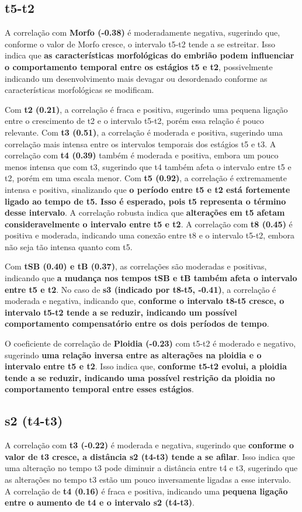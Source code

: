 \subsection*{t5-t2}
A correlação com \textbf{Morfo (-0.38)} é moderadamente negativa, sugerindo que, conforme o valor de Morfo cresce, o intervalo t5-t2 tende a se estreitar. Isso indica que \textbf{as características morfológicas do embrião podem influenciar o comportamento temporal entre os estágios t5 e t2}, possivelmente indicando um desenvolvimento mais devagar ou desordenado conforme as características morfológicas se modificam.

Com \textbf{t2 (0.21)}, a correlação é fraca e positiva, sugerindo uma pequena ligação entre o crescimento de t2 e o intervalo t5-t2, porém essa relação é pouco relevante. Com \textbf{t3 (0.51)}, a correlação é moderada e positiva, sugerindo uma correlação mais intensa entre os intervalos temporais dos estágios t5 e t3. A correlação com \textbf{t4 (0.39)} também é moderada e positiva, embora um pouco menos intensa que com t3, sugerindo que t4 também afeta o intervalo entre t5 e t2, porém em uma escala menor. Com \textbf{t5 (0.92)}, a correlação é extremamente intensa e positiva, sinalizando que \textbf{o período entre t5 e t2 está fortemente ligado ao tempo de t5. Isso é esperado, pois t5 representa o término desse intervalo}. A correlação robusta indica que \textbf{alterações em t5 afetam consideravelmente o intervalo entre t5 e t2}. A correlação com \textbf{t8 (0.45)} é positiva e moderada, indicando uma conexão entre t8 e o intervalo t5-t2, embora não seja tão intensa quanto com t5.

Com \textbf{tSB (0.40) e tB (0.37)}, as correlações são moderadas e positivas, indicando que \textbf{a mudança nos tempos tSB e tB também afeta o intervalo entre t5 e t2}. No caso de \textbf{s3 (indicado por t8-t5, -0.41)}, a correlação é moderada e negativa, indicando que, \textbf{conforme o intervalo t8-t5 cresce, o intervalo t5-t2 tende a se reduzir, indicando um possível comportamento compensatório entre os dois períodos de tempo}.

O coeficiente de correlação de \textbf{Ploidia (-0.23)} com t5-t2 é moderado e negativo, sugerindo \textbf{uma relação inversa entre as alterações na ploidia e o intervalo entre t5 e t2}. Isso indica que, \textbf{conforme t5-t2 evolui, a ploidia tende a se reduzir, indicando uma possível restrição da ploidia no comportamento temporal entre esses estágios}. 

\subsection*{s2 (t4-t3)}
A correlação com \textbf{t3 (-0.22)} é moderada e negativa, sugerindo que \textbf{conforme o valor de t3 cresce, a distância s2 (t4-t3) tende a se afilar}. Isso indica que uma alteração no tempo t3 pode diminuir a distância entre t4 e t3, sugerindo que as alterações no tempo t3 estão um pouco inversamente ligadas a esse intervalo. A correlação de \textbf{t4 (0.16)} é fraca e positiva, indicando uma \textbf{pequena ligação entre o aumento de t4 e o intervalo s2 (t4-t3)}. 

